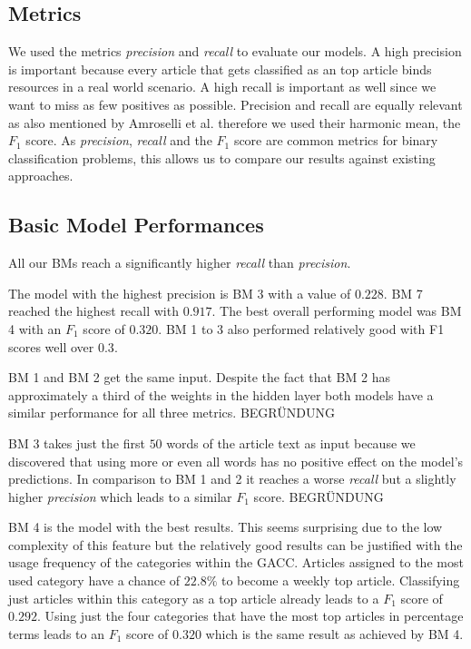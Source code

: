\subsection{Metrics}
We used the metrics \textit{precision} and \textit{recall} to evaluate our models. A high precision is important because every article that gets classified as an top article binds resources in a real world scenario. A high recall is important as well since we want to miss as few positives as possible. Precision and recall are equally relevant as also mentioned by Amroselli et al. therefore we used their harmonic mean, the $F_1$ score.
As \textit{precision}, \textit{recall} and the $F_1$ score are common metrics for binary classification problems, this allows us to compare our results against existing approaches.

\subsection{Basic Model Performances}
All our BMs reach a significantly higher \textit{recall} than \textit{precision}.

The model with the highest precision is BM 3 with a value of $0.228$. BM 7 reached the highest recall with $0.917$. The best overall performing model was BM 4 with an $F_1$ score of $0.320$. BM 1 to 3 also performed relatively good with F1 scores well over $0.3$.

BM 1 and BM 2 get the same input. Despite the fact that BM 2 has approximately a third of the weights in the hidden layer both models have a similar performance for all three metrics.
BEGRÜNDUNG

BM 3 takes just the first $50$ words of the article text as input because we discovered that using more or even all words has no positive effect on the model's predictions. In comparison to BM 1 and 2 it reaches a worse \textit{recall} but a slightly higher \textit{precision} which leads to a similar $F_1$ score.
BEGRÜNDUNG

BM 4 is the model with the best results. This seems surprising due to the low complexity of this feature but the relatively good results can be justified with the usage frequency of the categories within the GACC. Articles assigned to the most used category have a chance of $22.8\%$ to become a weekly top article. Classifying just articles within this category as a top article already leads to a $F_1$ score of $0.292$. Using just the four categories that have the most top articles in percentage terms leads to an $F_1$ score of $0.320$ which is the same result as achieved by BM 4.

